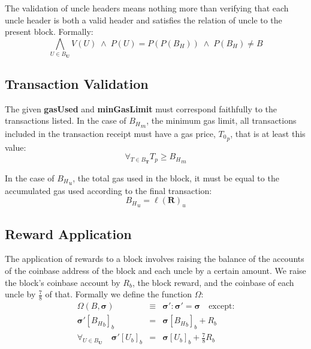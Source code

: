 \documentclass[9pt,oneside]{amsart}
\begin{document}
\begin{multicols}{2}
The validation of uncle headers means nothing more than verifying that each uncle header is both a valid header and satisfies the relation of uncle to the present block. Formally:
\begin{equation}
\bigwedge_{U \in B_\mathbf{U}} V(U) \; \wedge \; P(U) = P(P(B_H)) \; \wedge \; P(B_H) \neq B
\end{equation}

\subsection{Transaction Validation}


The given \textbf{gasUsed} and \textbf{minGasLimit} must correspond faithfully to the transactions listed. In the case of ${B_H}_m$, the minimum gas limit, all transactions included in the transaction receipt must have a gas price, ${T_0}_p$, that is at least this value:
\begin{equation}
\forall_{T \in B_\mathbf{T}} T_p \geq {B_H}_m
\end{equation}

In the case of ${B_H}_u$, the total gas used in the block, it must be equal to the accumulated gas used according to the final transaction:
\begin{equation}
{B_H}_u = \ell(\mathbf{R})_u
\end{equation}

\subsection{Reward Application}

The application of rewards to a block involves raising the balance of the accounts of the coinbase address of the block and each uncle by a certain amount. We raise the block's coinbase account by $R_b$, the block reward, and the coinbase of each uncle by $\frac{7}{8}$ of that. Formally we define the function $\Omega$:
\begin{eqnarray}
\Omega(B, \boldsymbol{\sigma}) & \equiv & \boldsymbol{\sigma}': \boldsymbol{\sigma}' = \boldsymbol{\sigma} \quad \text{except:} \\
\boldsymbol{\sigma}'[{B_H}_b]_b & = & \boldsymbol{\sigma}[{B_H}_b]_b + R_b \\
\forall_{U \in B_\mathbf{U}} \quad \boldsymbol{\sigma}'[U_b]_b & = & \boldsymbol{\sigma}[U_b]_b + \frac{7}{8}R_b
\end{eqnarray}


\end{multicols}
\end{document}
